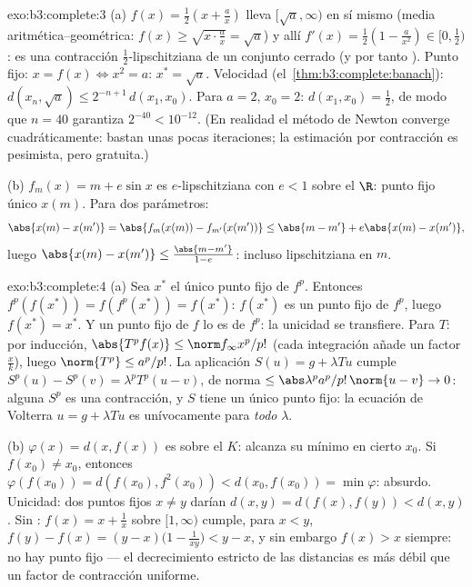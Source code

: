 \begin{solution}{exo:b3:complete:3}
(a) $f(x) = \frac12(x + \frac ax)$ lleva $[\sqrt a, \infty)$ en sí mismo
(media aritmética--geométrica:
$f(x) \geq \sqrt{x \cdot \frac ax} = \sqrt a$) y allí
$f'(x) = \frac12(1 - \frac a{x^2}) \in [0, \frac12)$: es una contracción
$\frac12$-lipschitziana de un conjunto cerrado (y por tanto
). Punto fijo:
$x = f(x) \iff x^2 = a$: $x^* = \sqrt a$. Velocidad
(el~\cref{thm:b3:complete:banach}): $d(x_n, \sqrt a) \leq
2^{-n+1}\,d(x_1, x_0)$. Para $a = 2$, $x_0 = 2$: $d(x_1, x_0) =
\frac12$, de modo que $n = 40$ garantiza $2^{-40} < 10^{-12}$. (En
realidad el método de Newton converge cuadráticamente: bastan unas pocas
iteraciones; la estimación por contracción es pesimista, pero gratuita.)

(b) $f_m(x) = m + e\sin x$ es $e$-lipschitziana con $e < 1$ sobre el
 $\R$: punto fijo único
$x(m)$. Para dos parámetros:
\[
\abs{x(m) - x(m')} = \abs{f_m(x(m)) - f_{m'}(x(m'))}
\leq \abs{m - m'} + e\abs{x(m) - x(m')},
\]
luego $\abs{x(m) - x(m')} \leq \frac{\abs{m - m'}}{1 - e}$: incluso
lipschitziana en $m$.
\end{solution}

\begin{solution}{exo:b3:complete:4}
(a) Sea $x^*$ el único punto fijo de $f^p$. Entonces
$f^p(f(x^*)) = f(f^p(x^*)) = f(x^*)$: $f(x^*)$ es un punto fijo de
$f^p$, luego $f(x^*) = x^*$. Y un punto fijo de $f$ lo es de $f^p$: la
unicidad se transfiere. Para $T$: por inducción, $\abs{T^pf(x)}
\leq \norm f_\infty x^p/p!$ (cada integración añade un factor
$\frac xk$), luego $\norm{T^p} \leq a^p/p!$. La aplicación $S(u) = g +
\lambda Tu$ cumple $S^p(u) - S^p(v) = \lambda^pT^p(u - v)$, de norma
$\leq \abs\lambda^pa^p/p!\,\norm{u - v} \to 0$: alguna $S^p$ es una
contracción, y $S$ tiene un único punto fijo: la ecuación de Volterra
$u = g + \lambda Tu$ es unívocamente
 para \emph{todo} $\lambda$.

(b) $\varphi(x) = d(x, f(x))$ es
 sobre el
 $K$: alcanza su mínimo en
cierto $x_0$. Si $f(x_0) \neq x_0$, entonces
$\varphi(f(x_0)) = d(f(x_0), f^2(x_0)) < d(x_0, f(x_0)) =
\min\varphi$: absurdo. Unicidad: dos puntos fijos $x \ne y$ darían
$d(x,y) = d(f(x), f(y)) < d(x,y)$. Sin : $f(x) = x + \frac1x$
sobre $[1, \infty)$ cumple, para $x < y$,
$f(y) - f(x) = (y - x)\bigl(1 - \frac1{xy}\bigr) <
y - x$, y sin embargo $f(x) > x$ siempre: no hay punto fijo --- el
decrecimiento estricto de las distancias es más débil que un factor de
contracción uniforme.
\end{solution}

